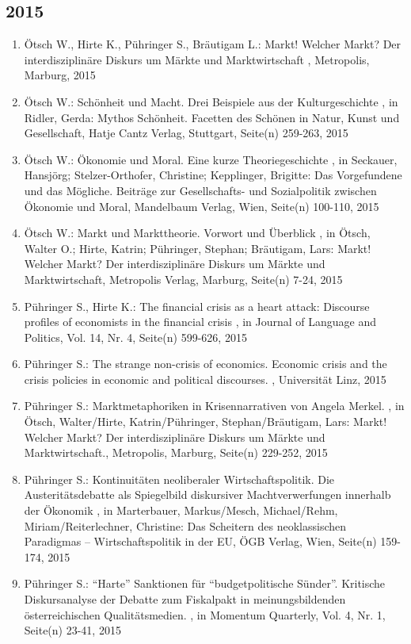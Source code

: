  \subsection*{2015} 
 \begin{enumerate}[leftmargin=*, labelsep=0.5cm] 
	 \item Ötsch W., Hirte K., Pühringer S., Bräutigam L.:  Markt! Welcher Markt? Der interdisziplinäre Diskurs um Märkte und Marktwirtschaft  , Metropolis, Marburg, 2015
	 \item Ötsch W.:  Schönheit und Macht. Drei Beispiele aus der Kulturgeschichte  , in Ridler, Gerda: Mythos Schönheit. Facetten des Schönen in Natur, Kunst und Gesellschaft, Hatje Cantz Verlag, Stuttgart, Seite(n) 259-263, 2015
	 \item Ötsch W.:  Ökonomie und Moral. Eine kurze Theoriegeschichte  , in Seckauer, Hansjörg; Stelzer-Orthofer, Christine; Kepplinger, Brigitte: Das Vorgefundene und das Mögliche. Beiträge zur Gesellschafts- und Sozialpolitik zwischen Ökonomie und Moral, Mandelbaum Verlag, Wien, Seite(n) 100-110, 2015
	 \item Ötsch W.:  Markt und Markttheorie. Vorwort und Überblick  , in Ötsch, Walter O.; Hirte, Katrin; Pühringer, Stephan; Bräutigam, Lars: Markt! Welcher Markt? Der interdisziplinäre Diskurs um Märkte und Marktwirtschaft, Metropolis Verlag, Marburg, Seite(n) 7-24, 2015
	 \item Pühringer S., Hirte K.:  The financial crisis as a heart attack: Discourse profiles of economists in the financial crisis  , in Journal of Language and Politics, Vol. 14, Nr. 4, Seite(n) 599-626, 2015
	 \item Pühringer S.:  The strange non-crisis of economics. Economic crisis and the crisis policies in economic and political discourses.  , Universität Linz, 2015
	 \item Pühringer S.:  Marktmetaphoriken in Krisennarrativen von Angela Merkel.  , in Ötsch, Walter/Hirte, Katrin/Pühringer, Stephan/Bräutigam, Lars: Markt! Welcher Markt? Der interdisziplinäre Diskurs um Märkte und Marktwirtschaft., Metropolis, Marburg, Seite(n) 229-252, 2015
	 \item Pühringer S.:  Kontinuitäten neoliberaler Wirtschaftspolitik. Die Austeritätsdebatte als Spiegelbild diskursiver Machtverwerfungen innerhalb der Ökonomik  , in Marterbauer, Markus/Mesch, Michael/Rehm, Miriam/Reiterlechner, Christine: Das Scheitern des neoklassischen Paradigmas – Wirtschaftspolitik in der EU, ÖGB Verlag, Wien, Seite(n) 159-174, 2015
	 \item Pühringer S.:  “Harte” Sanktionen für “budgetpolitische Sünder”. Kritische Diskursanalyse der Debatte zum Fiskalpakt in meinungsbildenden österreichischen Qualitätsmedien.  , in Momentum Quarterly, Vol. 4, Nr. 1, Seite(n) 23-41, 2015

\end{enumerate}
